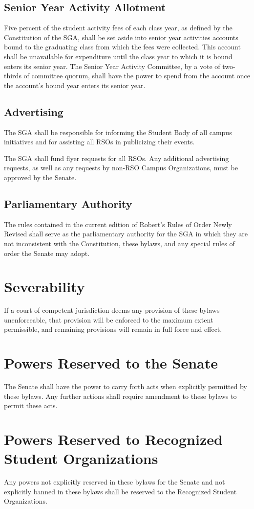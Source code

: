 \documentclass[12pt]{scrreprt}
\begin{document}
\section{Senior Year Activity Allotment}
Five percent of the student activity fees of each class year, as defined by 
the Constitution of the SGA, shall be set aside into senior year activities 
accounts bound to the graduating class from which the fees were collected. 
This account shall be unavailable for expenditure until the class year to 
which it is bound enters its senior year. The Senior Year Activity Committee, 
by a vote of two-thirds of committee quorum, shall have the power to spend 
from the account once the account's bound year enters its senior year. 

\section{Advertising}
The SGA shall be responsible for informing the Student Body of all campus 
initiatives and for assisting all RSOs in publicizing their events. 

The SGA shall fund flyer requests for all RSOs. Any additional advertising 
requests, as well as any requests by non-RSO Campus Organizations, must be 
approved by the Senate. 

\section{Parliamentary Authority} 
The rules contained in the current edition of Robert's Rules of Order Newly Revised shall serve
as the parliamentary authority for the SGA in which they are not inconsistent with the
Constitution, these bylaws, and any special rules of order the Senate may adopt.


\chapter{Severability}
If a court of competent jurisdiction deems any provision of these bylaws 
unenforceable, that provision will be enforced to the maximum extent 
permissible, and remaining provisions will remain in full force and effect. 

\chapter{Powers Reserved to the Senate} \label{sec:senate_powers}
The Senate shall have the power to carry forth acts when explicitly permitted 
by these bylaws. Any further actions shall require amendment to these bylaws 
to permit these acts. 

\chapter{Powers Reserved to Recognized Student Organizations} \label{sec:rso_powers}
Any powers not explicitly reserved in these bylaws for the Senate and not 
explicitly banned in these bylaws shall be reserved to the Recognized Student 
Organizations.
\end{document}
